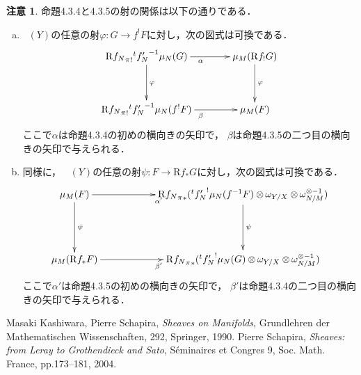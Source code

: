 \documentclass[uplatex,dvipdfmx,a4paper,10pt,draft]{jsarticle}
\theoremstyle{definition}
\numberwithin{equation}{section}
\newcommand{\Dompb}{\mathop{\mathsf{D}^\mathrm{b}}\nolimits}
\newcommand{\mhom}{\mathop{\mu\hspace{-0pt}hom}\nolimits}
\newcommand{\Rder}{\mathrm{R}}
\newcommand{\tens}[1][]{\mathbin{\otimes_{\raise1.5ex\hbox to-.1em{}{#1}}}}
\theoremstyle{mystyle}
\newtheorem{RMK}[mythm]{注意}
\begin{document}
\begin{RMK}
    命題4.3.4と4.3.5の射の関係は以下の通りである．
    \begin{enumerate}[(a)]
        \item \(\Dompb(Y)\)の任意の射\(\varphi\colon G\to f^{!}F\)に対し，次の図式は可換である．
        \[    
            \vcenter{\xymatrix@C=36pt@R=36pt{
            \Rder{{f_{N}}_{\pi}}_{!}{{}^t{f'_{N}}^{-1}}\mu_{N}(G)
            \ar[d]^{\varphi}
            \ar[r]_{\alpha}
            &
            \mu_{M}(\Rder{f_{!}}G)
            \ar[d]^{\varphi}
            \\
            \Rder{{f_{N}}_{\pi}}_{!}{{}^t{f'_{N}}^{-1}}\mu_{N}(f^{!}F)
            \ar[r]_{\beta}
            &
            \mu_{M}(F)
            }}
        \]    
        ここで\(\alpha\)は命題4.3.4の初めの横向きの矢印で，
        \(\beta\)は命題4.3.5の二つ目の横向きの矢印で与えられる．
        \item 同様に，
        \(\Dompb(Y)\)の任意の射\(
            \psi\colon F\to \Rder{f_{\ast}}G
        \)に対し，次の図式は可換である．
        \[\vcenter{\xymatrix@C=56pt@R=46pt{
            \mu_{M}(F)
            \ar[d]^{\psi}
            \ar[r]_{\alpha'}
            &
            \Rder{{f_{N}}_{\pi}}_{\ast}(
                {{}^t{f'_{N}}^{!}}\mu_{N}(f^{-1}F)
                \tens[]\omega_{Y/X}
                \tens[]\omega_{N/M}^{\otimes{-1}}
            )
            \ar[d]^{\psi}
            \\
            \mu_{M}(\Rder{f_{\ast}}F)
            \ar[r]_{\beta'}
            &
            \Rder{{f_{N}}_{\pi}}_{\ast}(
                {{}^t{f'_{N}}^{!}}\mu_{N}(G)
                \tens[]\omega_{Y/X}
                \tens[]\omega_{N/M}^{\otimes{-1}}
            )
        }}\]ここで\(\alpha'\)は命題4.3.5の初めの横向きの矢印で，
        \(\beta'\)は命題4.3.4の二つ目の横向きの矢印で与えられる．
    \end{enumerate}
\end{RMK}




\begin{thebibliography}{20} 
     Masaki Kashiwara, Pierre Schapira, 
      \textit{Sheaves on Manifolds}, 
      Grundlehren der Mathematischen Wissenschaften, 292, Springer, 1990.
     Pierre Schapira, 
      \textit{Sheaves: from Leray to Grothendieck and Sato}, 
      S\'eminaires et Congres 9, Soc. Math. France, pp.173--181, 2004.
\end{thebibliography}
  
\end{document}
